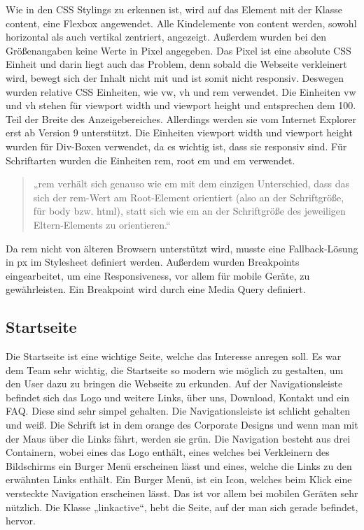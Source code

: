 Wie in den CSS Stylings zu erkennen ist, wird auf das Element mit der Klasse content, eine Flexbox angewendet. Alle Kindelemente von content werden, sowohl horizontal als auch vertikal zentriert, angezeigt. Außerdem wurden bei den Größenangaben keine Werte in Pixel angegeben. Das Pixel ist eine absolute CSS Einheit und darin liegt auch das Problem, denn sobald die Webseite verkleinert wird, bewegt sich der Inhalt nicht mit und ist somit nicht responsiv. Deswegen wurden relative CSS Einheiten, wie vw, vh und rem verwendet. Die Einheiten vw und vh stehen für viewport width und viewport height und entsprechen dem 100. Teil der Breite des Anzeigebereiches. Allerdings werden sie vom Internet Explorer erst ab Version 9 unterstützt. Die Einheiten viewport width und viewport height wurden für Div-Boxen verwendet, da es wichtig ist, dass sie responsiv sind.\cite{wiki}  Für Schriftarten wurden die Einheiten rem, root em und em verwendet. 
\begin{quote}
„rem verhält sich genauso wie em mit dem einzigen Unterschied, dass das sich der rem-Wert am Root-Element orientiert (also an der Schriftgröße, für body bzw. html), statt sich wie em an der Schriftgröße des jeweiligen Eltern-Elements zu orientieren.“ \cite{remzitat}
\end{quote}
Da rem nicht von älteren Browsern unterstützt wird, musste eine Fallback-Lösung in px im Stylesheet definiert werden. \cite{remzitat}  Außerdem wurden Breakpoints eingearbeitet, um eine Responsiveness, vor allem für mobile Geräte, zu gewährleisten. Ein Breakpoint wird durch eine Media Query definiert.
\subsection{Startseite}
Die Startseite ist eine wichtige Seite, welche das Interesse anregen soll. Es war dem Team sehr wichtig, die Startseite so modern wie möglich zu gestalten, um den User dazu zu bringen die Webseite zu erkunden. Auf der Navigationsleiste befindet sich das Logo und weitere Links, über uns, Download, Kontakt und ein FAQ. Diese sind sehr simpel gehalten. Die Navigationsleiste ist schlicht gehalten und weiß. Die Schrift ist in dem orange des Corporate Designs und wenn man mit der Maus über die Links fährt, werden sie grün. Die Navigation besteht aus drei Containern, wobei eines das Logo enthält, eines welches bei Verkleinern des Bildschirms ein Burger Menü erscheinen lässt und eines, welche die Links zu den erwähnten Links enthält. Ein Burger Menü, ist ein Icon, welches beim Klick eine versteckte Navigation erscheinen lässt. Das ist vor allem bei mobilen Geräten sehr nützlich.\cite{burgermenu} Die Klasse „linkactive“, hebt die Seite, auf der man sich gerade befindet, hervor.  \newpage


